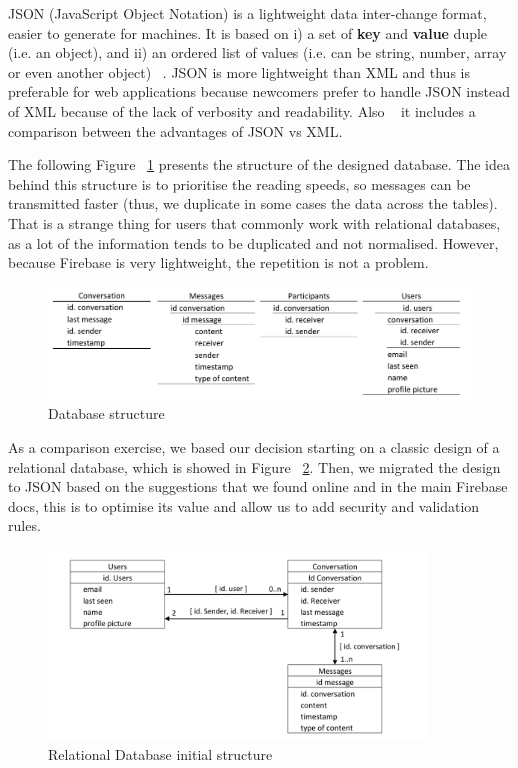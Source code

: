 JSON (JavaScript Object Notation) is a lightweight data inter-change format, easier to generate for machines. It is based on i) a set of \textbf{key} and \textbf{value} duple (i.e. an object), and ii) an ordered list of values (i.e. can be string, number, array or even another object) ~\cite{1sejkfhs}. JSON is more lightweight than XML and thus is preferable for web applications because newcomers prefer to handle JSON instead of XML because of the lack of verbosity and readability. Also ~\cite{1sejkfhs} it includes a comparison between the advantages of JSON vs XML.

The following Figure ~\ref{fig:database} presents the structure of the designed database. The idea behind this structure is to prioritise the reading speeds, so messages can be transmitted faster (thus, we duplicate in some cases the data across the tables). That is a strange thing for users that commonly work with relational databases, as a lot of the information tends to be duplicated and not normalised. However, because Firebase is very lightweight, the repetition is not a problem.

\begin{figure}[ht]
\centering
\includegraphics[width=1\textwidth]{figs/database}
	\caption{Database structure}
	\label{fig:database}
\end{figure}

As a comparison exercise, we based our decision starting on a classic design of a relational database, which is showed in Figure ~\ref{fig:rdatabase}. Then, we migrated the design to JSON based on the suggestions that we found online and in the main Firebase docs, this is to optimise its value and allow us to add security and validation rules.

\begin{figure}[ht]
\centering
\includegraphics[width=0.9\textwidth]{figs/relationaldatabase}
	\caption{Relational Database initial structure}
	\label{fig:rdatabase}
\end{figure}

